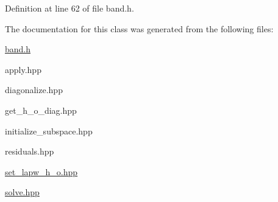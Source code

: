 Definition at line 62 of file band.\+h.



The documentation for this class was generated from the following files\+:\begin{DoxyCompactItemize}
\item 
\hyperlink{band_8h}{band.\+h}\item 
apply.\+hpp\item 
diagonalize.\+hpp\item 
get\+\_\+h\+\_\+o\+\_\+diag.\+hpp\item 
initialize\+\_\+subspace.\+hpp\item 
residuals.\+hpp\item 
\hyperlink{set__lapw__h__o_8hpp}{set\+\_\+lapw\+\_\+h\+\_\+o.\+hpp}\item 
\hyperlink{solve_8hpp}{solve.\+hpp}\end{DoxyCompactItemize}
